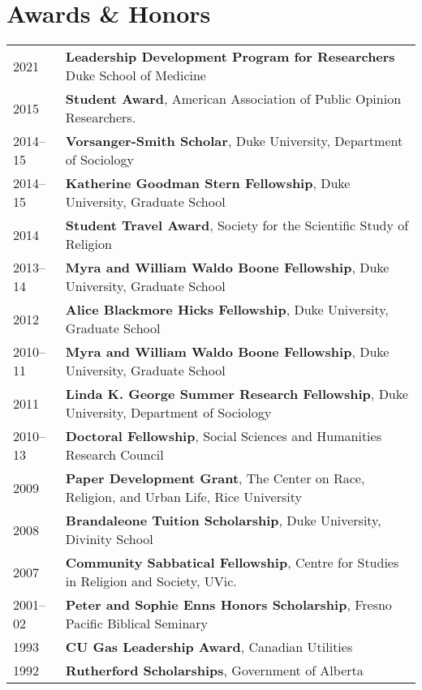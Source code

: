 \section*{Awards \& Honors}

\begin{longtable}{p{} p{}}
2021 & \textbf{Leadership Development Program for Researchers} Duke School of Medicine\\
2015 & \textbf{Student Award}, American Association of Public Opinion Researchers.\\
2014--15 & \textbf{Vorsanger-Smith Scholar}, Duke University, Department of Sociology\\
2014--15 & \textbf{Katherine Goodman Stern Fellowship}, Duke University, Graduate School\\
2014 & \textbf{Student Travel Award}, Society for the Scientific Study of Religion\\
2013--14 & \textbf{Myra and William Waldo Boone Fellowship}, Duke University, Graduate School\\
2012 & \textbf{Alice Blackmore Hicks Fellowship}, Duke University, Graduate School\\
2010--11 & \textbf{Myra and William Waldo Boone Fellowship}, Duke University, Graduate School\\
2011 & \textbf{Linda K. George Summer Research Fellowship}, Duke University, Department of Sociology\\
2010--13 & \textbf{Doctoral Fellowship}, Social Sciences and Humanities Research Council\\
2009 & \textbf{Paper Development Grant}, The Center on Race, Religion, and Urban Life, Rice University\\
2008 & \textbf{Brandaleone Tuition Scholarship}, Duke University, Divinity School\\
2007 & \textbf{Community Sabbatical Fellowship}, Centre for Studies in Religion and Society, UVic.\\
2001--02 & \textbf{Peter and Sophie Enns Honors Scholarship}, Fresno Pacific Biblical Seminary\\
1993 & \textbf{CU Gas Leadership Award}, Canadian Utilities\\
1992 & \textbf{Rutherford Scholarships}, Government of Alberta\\
\end{longtable}
